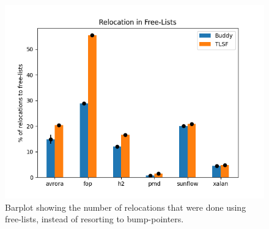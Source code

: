 \begin{figure}[H]
  \centering
  \includegraphics[width=1\textwidth]{figures/relocation_utilization2.png}
  \caption{Barplot showing the number of relocations that were done using free-lists, instead of resorting to bump-pointers.} 
  \label{fig:relocation-utilization}
\end{figure}